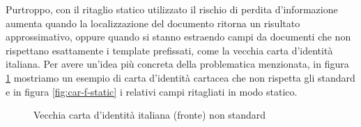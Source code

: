 \begin{table}[H]
	\centering
	\caption{Coordinate campi vecchia carta d'identit\`a italiana (retro)}
	\label{tab:car-r-coords}
\end{table}
Purtroppo, con il ritaglio statico utilizzato il rischio di perdita d'informazione aumenta quando la localizzazione del documento ritorna un risultato approssimativo, oppure quando si stanno estraendo campi da documenti che non rispettano esattamente i template prefissati, come la vecchia carta d'identit\`a italiana. Per avere un'idea pi\`u concreta della problematica menzionata, in figura \ref{fig:car-f-example} mostriamo un esempio di carta d'identit\`a cartacea che non rispetta gli standard e in figura \ref{fig:car-f-static} i relativi campi ritagliati in modo statico.\par
\begin{figure}[H]
	\centering
	\caption{Vecchia carta d'identit\`a italiana (fronte) non standard} \label{fig:car-f-example}
\end{figure}
